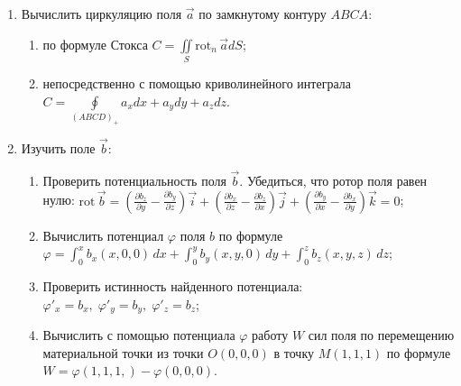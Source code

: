 \documentclass[14pt,a4paper,final]{extreport}
\begin{document}
\begin{enumerate}[label=\arabic*.]
\begin{enumerate}[label=\theenumi\arabic*]
		\item Вычислить поток непосредственно через поверхностный интеграл\\ \( P = \iint\limits_S xzdydz + xydzdx + yzdxdy \).
	\end{enumerate}
	
	\item Вычислить циркуляцию поля \( \vec a \) по замкнутому контуру \( ABCA \):

\pagebreak %
	
	\begin{enumerate}[label=\theenumi\arabic*]
		\item по формуле Стокса \( C = \iint\limits_S \mathrm{rot}_n \, \vec a dS \);
		
		\item непосредственно с помощью криволинейного интеграла \( C = \oint\limits_{(ABCD)_+}{a_xdx + a_ydy + a_zdz} \).
	\end{enumerate}
	
	\item Изучить поле \( \vec b \):
	
	\begin{enumerate}[label=\theenumi\arabic*]
		\item Проверить потенциальность поля \( \vec b \). Убедиться, что ротор поля равен нулю: \( \mathrm{rot} \, \vec b = (\frac{\partial b_z}{\partial y} - \frac{\partial b_y}{\partial z})\vec i + (\frac{\partial b_x}{\partial z} - \frac{\partial b_z}{\partial x})\vec j + (\frac{\partial b_y}{\partial x} - \frac{\partial b_x}{\partial y})\vec k = 0 \);
		
		\item Вычислить потенциал \( \varphi \) поля \( b \) по формуле \( \varphi = \int_0^x{b_x(x,0,0)\,dx} + \int_0^y{b_y(x,y,0)\,dy} +\int_0^z{b_z(x,y,z)\,dz} \);
		
		\item Проверить истинность найденного потенциала: \\\( \varphi'_x = b_x\mathrm{,}\;\varphi'_y = b_y\mathrm{,}\;\varphi'_z = b_z \);
		
		\item Вычислить с помощью потенциала \( \varphi \) работу \( W \) сил поля по перемещению материальной точки из точки \(O(0,0,0) \) в точку \( M(1,1,1) \) по формуле $W = \varphi(1, 1, 1,) - \varphi(0, 0, 0)$.
	\end{enumerate}

	

\end{enumerate}
\end{document}

